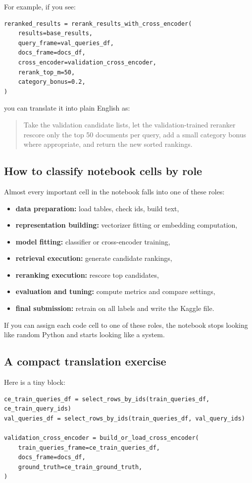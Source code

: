 \documentclass[10pt]{article}
\begin{document}
For example, if you see:
\begin{lstlisting}[caption={A tiny code-reading exercise}]
reranked_results = rerank_results_with_cross_encoder(
    results=base_results,
    query_frame=val_queries_df,
    docs_frame=docs_df,
    cross_encoder=validation_cross_encoder,
    rerank_top_m=50,
    category_bonus=0.2,
)
\end{lstlisting}

you can translate it into plain English as:
\begin{quote}
Take the validation candidate lists, let the validation-trained reranker rescore only the top 50 documents per query, add a small category bonus where appropriate, and return the new sorted rankings.
\end{quote}

\subsection*{How to classify notebook cells by role}

Almost every important cell in the notebook falls into one of these roles:
\begin{itemize}
    \item \textbf{data preparation:} load tables, check ids, build text,
    \item \textbf{representation building:} vectorizer fitting or embedding computation,
    \item \textbf{model fitting:} classifier or cross-encoder training,
    \item \textbf{retrieval execution:} generate candidate rankings,
    \item \textbf{reranking execution:} rescore top candidates,
    \item \textbf{evaluation and tuning:} compute metrics and compare settings,
    \item \textbf{final submission:} retrain on all labels and write the Kaggle file.
\end{itemize}

If you can assign each code cell to one of these roles, the notebook stops looking like random Python and starts looking like a system.

\subsection*{A compact translation exercise}

Here is a tiny block:
\begin{lstlisting}[caption={Translate the code into the pipeline story}]
ce_train_queries_df = select_rows_by_ids(train_queries_df, ce_train_query_ids)
val_queries_df = select_rows_by_ids(train_queries_df, val_query_ids)

validation_cross_encoder = build_or_load_cross_encoder(
    train_queries_frame=ce_train_queries_df,
    docs_frame=docs_df,
    ground_truth=ce_train_ground_truth,
)
\end{lstlisting}
\end{document}
